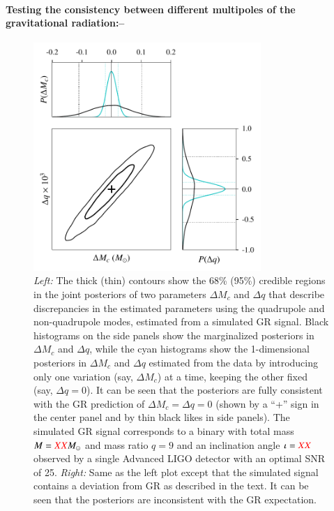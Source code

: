 \documentclass[prl,preprintnumbers,twocolumn,eqsecnum,floatfix,a4paper,nofootinbib,superscriptaddress]{revtex4}
\newcommand{\red}[1]{\textcolor{red}{#1}}
\begin{document}
\paragraph{Testing the consistency between different multipoles of the gravitational radiation:--}

\begin{figure}[htb] \begin{center}
\includegraphics[width=3.4in]{figs/fig1_GR.pdf}
\caption{\emph{Left:} The thick (thin) contours show the 68\% (95\%) credible regions in the joint posteriors of two parameters $\Delta M_c$ and $\Delta q$ that describe discrepancies in the estimated parameters using the quadrupole and non-quadrupole modes, estimated from a simulated GR signal. Black histograms on the side panels show the marginalized posteriors in $\Delta M_c$ and $\Delta q$, while the cyan histograms show the 1-dimensional posteriors in $\Delta M_c$ and $\Delta q$ estimated from the data by introducing only one variation (say, $\Delta M_c$) at a time, keeping the other fixed (say, $\Delta q = 0$). It can be seen that the posteriors are fully consistent with the GR prediction of $\Delta M_c = \Delta q = 0$ (shown by a ``+'' sign in the center panel and by thin black likes in side panels).  The simulated GR signal corresponds to a binary with total mass $M = \red{XX}M_\odot$ and mass ratio $q = 9$ and an inclination angle $\iota = \red{XX}$ observed by a single Advanced LIGO detector with an optimal SNR of 25. \emph{Right:} Same as the left plot except that the simulated signal contains a deviation from GR as described in the text. It can be seen that the posteriors are inconsistent with the GR expectation.}
\label{fig:contour_plots}
\end{center} \end{figure}
\end{document}
